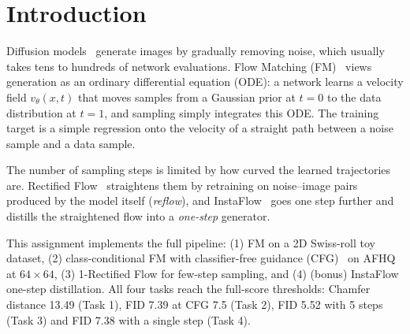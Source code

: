 \section{Introduction}
\label{sec:intro}

Diffusion models~\cite{ho2020ddpm,song2021ddim} generate images by gradually removing noise, which usually takes tens to hundreds of network evaluations.
Flow Matching (FM)~\cite{lipman2023flow} views generation as an ordinary differential equation (ODE): a network learns a velocity field $v_\theta(x,t)$ that moves samples from a Gaussian prior at $t=0$ to the data distribution at $t=1$, and sampling simply integrates this ODE.
The training target is a simple regression onto the velocity of a straight path between a noise sample and a data sample.

The number of sampling steps is limited by how curved the learned trajectories are.
Rectified Flow~\cite{liu2023rectified} straightens them by retraining on noise--image pairs produced by the model itself (\emph{reflow}), and InstaFlow~\cite{liu2024instaflow} goes one step further and distills the straightened flow into a \emph{one-step} generator.

This assignment implements the full pipeline:
(1) FM on a 2D Swiss-roll toy dataset,
(2) class-conditional FM with classifier-free guidance (CFG)~\cite{ho2021cfg} on AFHQ~\cite{choi2020starganv2} at $64\times64$,
(3) 1-Rectified Flow for few-step sampling, and
(4) (bonus) InstaFlow one-step distillation.
All four tasks reach the full-score thresholds: Chamfer distance 13.49 (Task 1), FID 7.39 at CFG 7.5 (Task 2), FID 5.52 with 5 steps (Task 3) and FID 7.38 with a single step (Task 4).

